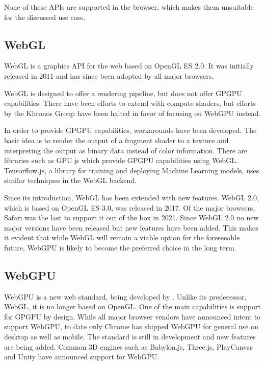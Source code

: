 None of these \glspl{API} are supported in the browser, which makes them unsuitable for the discussed use case.

\subsection{WebGL}

\gls{WebGL} is a graphics \gls{API} for the web based on \gls{OpenGL ES} 2.0. It was initially released in 2011 and has since been adopted by all major browsers.

\gls{WebGL} is designed to offer a rendering pipeline, but does not offer \gls{GPGPU} capabilities. There have been efforts to extend with compute shaders, but efforts by the \gls{Khronos Group} have been halted in favor of focusing on \gls{WebGPU} instead.

In order to provide \gls{GPGPU} capabilities, workarounds have been developed. The basic idea is to render the output of a fragment shader to a texture and interpreting the output as binary data instead of color information.
There are libraries such as GPU.js which provide \gls{GPGPU} capabilities using \gls{WebGL}. Tensorflow.js, a library for training and deploying Machine Learning models, uses similar techniques in the \gls{WebGL} backend.

Since its introduction, \gls{WebGL} has been extended with new features. \gls{WebGL} 2.0, which is based on \gls{OpenGL ES} 3.0, was released in 2017. Of the major browsers, Safari was the last to support it out of the box in 2021. Since \gls{WebGL} 2.0 no new major versions have been released but new features have been added. This makes it evident that while \gls{WebGL} will remain a viable option for the foreseeable future, \gls{WebGPU} is likely to become the preferred choice in the long term.

\subsection{WebGPU}

\gls{WebGPU} is a new web standard, being developed by  \cite{webgpuSpecification}. Unlike its predecessor, \gls{WebGL}, it is no longer based on \gls{OpenGL}. One of the main capabilities is support for \gls{GPGPU} by design. While all major browser vendors have announced intent to support \gls{WebGPU}, to date only Chrome has shipped \gls{WebGPU} for general use on desktop as well as mobile.
The standard is still in development and new features are being added.
Common 3D engines such as \gls{Babylon.js}, \gls{Three.js}, \gls{PlayCanvas} and \gls{Unity} have announced support for \gls{WebGPU}.

